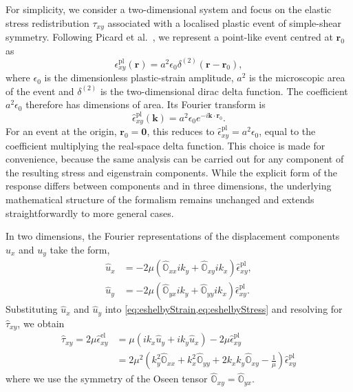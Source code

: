 For simplicity, we consider a two-dimensional system and focus on the elastic stress redistribution $\tau_{xy}$ associated with a localised plastic event of simple-shear symmetry. Following Picard et al.~\cite{picard_elastic_2004}, we represent a point-like event centred at $\bm{r}_0$ as
\begin{equation}
    \epsilon_{xy}^{\mathrm{pl}}(\bm{r})
    =
    a^2\epsilon_0\delta^{(2)}(\bm{r}-\bm{r}_0),
\end{equation}
where $\epsilon_0$ is the dimensionless plastic-strain amplitude, $a^2$ is the microscopic area of the event and $\delta^{(2)}$ is the two-dimensional dirac delta function. The coefficient $a^2\epsilon_0$ therefore has dimensions of area. Its Fourier transform is
\[
    \hat{\epsilon}_{xy}^{\mathrm{pl}}(\bm{k})
    =
    a^2\epsilon_0e^{-i\bm{k}\cdot\bm{r}_0}.
\]
For an event at the origin, $\bm{r}_0=\bm{0}$, this reduces to $\hat{\epsilon}_{xy}^{\mathrm{pl}}=a^2\epsilon_0$, equal to the coefficient multiplying the real-space delta function.
This choice is made for convenience, because the same analysis can be carried out for any component of the resulting stress and eigenstrain components. While the explicit form of the response differs between components and in three dimensions, the underlying mathematical structure of the formalism remains unchanged and extends straightforwardly to more general cases.

In two dimensions, the Fourier representations of the displacement components $u_x$ and $u_y$ take the form,
\begin{subequations}
\begin{align}
    \hat{u}_x &= -2\mu\left(\hat{\mathbb{O}}_{xx}ik_y + \hat{\mathbb{O}}_{xy} ik_x \right)\hat{\epsilon}_{xy}^{\mathrm{pl}}, \label{eq:ux}\\
    \hat{u}_y &= -2\mu\left(\hat{\mathbb{O}}_{yx}ik_y + \hat{\mathbb{O}}_{yy} ik_x \right)\hat{\epsilon}_{xy}^{\mathrm{pl}}. \label{eq:uy}
\end{align}
\end{subequations}
Substituting $\hat{u}_x$ and $\hat{u}_y$ into \cref{eq:eshelbyStrain,eq:eshelbyStress} and resolving for $\hat{\tau}_{xy}$, we obtain
\begin{align*}
    \hat{\tau}_{xy} = 2\mu \hat{\epsilon}^{\mathrm{el}}_{xy} &= \mu\left( i k_x \hat{u}_y + i k_y \hat{u}_x \right) - 2\mu\hat{\epsilon}_{xy}^{\mathrm{pl}}\\
    & = 2\mu^2 \left( k_y^2 \hat{\mathbb{O}}_{xx} + k_x^2 \hat{\mathbb{O}}_{yy} + 2 k_x k_y\hat{\mathbb{O}}_{xy} - \frac{1}{\mu} \right)\hat{\epsilon}_{xy}^{\mathrm{pl}}
\end{align*}
where we use the symmetry of the Oseen tensor $\hat{\mathbb{O}}_{xy}=\hat{\mathbb{O}}_{yx}$.

